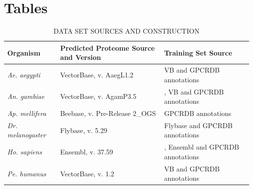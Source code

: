 \section{Tables}


\begin{table}[H]
  \caption{\uppercase{Data Set Sources and Construction}}
  \small
  \begin{tabular}{| l | p{5cm} | p{5cm} |}
    \hline
    \textbf{Organism} & \textbf{Predicted Proteome Source and Version} & \textbf{Training Set Source} \\ \hline
    \emph{Ae. aegypti} & VectorBase, v. AaegL1.2 & VB and GPCRDB annotations \\ \hline
    \emph{An. gambiae} & VectorBase, v. AgamP3.5 & \cite{Hill2002}, VB and GPCRDB annotations \\ \hline
    \emph{Ap. mellifera} & Beebase, v. Pre-Release 2\_OGS & GPCRDB annotations \\ \hline
    \emph{Dr. melanogaster} & Flybase, v. 5.29 & Flybase and GPCRDB annotations \\ \hline
    \emph{Ho. sapiens} & Ensembl, v. 37.59 & \cite{Zhang2006}, Ensembl and GPCRDB annotations \\ \hline
    \emph{Pe. humanus} & VectorBase, v. 1.2 & VB and GPCRDB annotations \\ \hline
  \end{tabular}
  \label{tab:data-sources}
  
\end{table}

